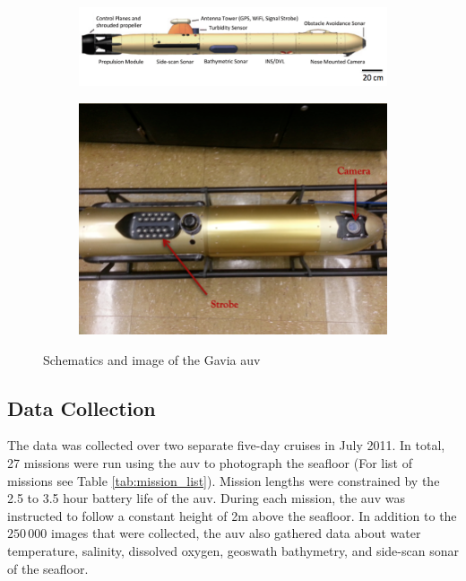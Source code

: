 \documentclass {udthesis}
\begin{document}
\begin{figure}
  \centering
  \begin{subfigure}[]{0.7\textwidth}
      \includegraphics[width=\textwidth,natwidth=1052,natheight=428]{auv_schematics}
  \end{subfigure}
  \begin{subfigure}[]{0.6\textwidth}
      \includegraphics[width=\textwidth,natwidth=690,natheight=518]{auv_image}    
  \end{subfigure}
  \caption{Schematics and image of the Gavia \gls{auv} }
  \label{fig:gavia_auv}
\end{figure}

\subsection{Data Collection}

The data was collected over two separate five-day cruises in July 2011.   
In total, 27 missions were run using the \gls{auv} to photograph the seafloor (For list of missions see Table \ref{tab:mission_list}).  
Mission lengths were constrained by the 2.5 to 3.5 hour battery life of the \gls{auv}.  
During each mission, the \gls{auv} was instructed to follow a constant height of 2\;m
above the seafloor.  In addition to the $250\,000$ images that were collected, the 
\gls{auv} also gathered data about water temperature, salinity, dissolved oxygen, 
geoswath bathymetry, and side-scan sonar of the seafloor.
\end{document}
